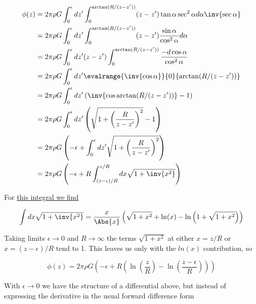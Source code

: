 \begin{align*}
\phi(z) 
&= 
2 \pi \rho G \int_0^\epsilon dz' \int_0^{\arctan(R/(z-z'))} (z - z') \tan \alpha \sec^2 \alpha d\alpha \inv{ \sec\alpha} \\
&= 
2 \pi \rho G \int_0^\epsilon dz' \int_0^{\arctan(R/(z-z'))} (z - z') \frac{\sin \alpha}{\cos^2\alpha} d\alpha \\
&= 
2 \pi \rho G \int_0^\epsilon dz' (z - z')\int_0^{\arctan(R/(z-z'))} \frac{-d\cos \alpha}{\cos^2\alpha} \\
&= 
2 \pi \rho G \int_0^\epsilon dz' \evalrange{\inv{\cos\alpha}}{0}{\arctan(R/(z-z'))} \\
&= 
2 \pi \rho G \int_0^\epsilon dz' \left( \inv{\cos\arctan(R/(z-z'))} -1 \right) \\
&= 
2 \pi \rho G \int_0^\epsilon dz' \left( \sqrt{1 + \left(\frac{R}{z-z'}\right)^2} -1 \right) \\
&=
2 \pi \rho G 
\left( -\epsilon +
\int_0^\epsilon dz' 
\sqrt{1 + \left(\frac{R}{z-z'}\right)^2} \right)  \\
&=
2 \pi \rho G 
\left( -\epsilon + R
\int_{(z - \epsilon)/R}^{z/R} dx
\sqrt{1 + \inv{x^2}}
\right)
\end{align*}

For \href{https://raw.github.com/peeterjoot/physicsplay/master/notes/phy454/continuumProblemSet1Q3.cdf}{this integral we find}

\begin{equation}\label{eqn:classicalMechanicsPs2:270}
\int dx \sqrt{1 + \inv{x^2}} 
=
\frac{x}{\Abs{x}}
\left(\sqrt{1+x^2}+\ln(x)-\ln\left(1+\sqrt{1+x^2}\right)\right)
\end{equation}

Taking limits $\epsilon \rightarrow 0$ and $R \rightarrow \infty$ the terms
$\sqrt{1 + x^2}$ at either $x = z/R$ or $x = (z-\epsilon)/R$ tend to 1.  This leaves us only with the $ln(x)$ contribution, so

\begin{equation}\label{eqn:classicalMechanicsPs2:290}
\phi(z) =
2 \pi \rho G 
\left( -\epsilon + R \left( 
\ln\left(\frac{z}{R}\right) -\ln\left(\frac{z - \epsilon}{R}\right) \right)\right)
\end{equation}

With $\epsilon \rightarrow 0$ we have the structure of a differential above, but instead of expressing the derivative in the usual forward difference form

